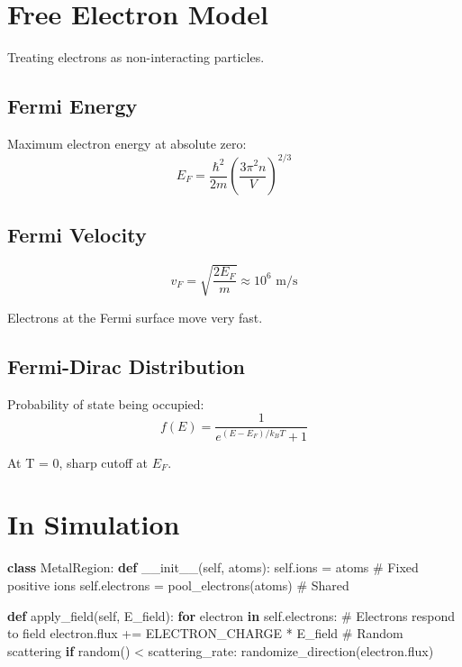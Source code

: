 \documentclass[
  11pt,
  letterpaper,
  twoside,
  openright]{book}
\newenvironment{Shaded}{\begin{snugshade}}{\end{snugshade}}
\newcommand{\CommentTok}[1]{\textcolor[rgb]{0.37,0.37,0.37}{#1}}
\newcommand{\ControlFlowTok}[1]{\textcolor[rgb]{0.00,0.23,0.31}{\textbf{#1}}}
\newcommand{\FunctionTok}[1]{\textcolor[rgb]{0.28,0.35,0.67}{#1}}
\newcommand{\KeywordTok}[1]{\textcolor[rgb]{0.00,0.23,0.31}{\textbf{#1}}}
\newcommand{\NormalTok}[1]{\textcolor[rgb]{0.00,0.23,0.31}{#1}}
\newcommand{\OperatorTok}[1]{\textcolor[rgb]{0.37,0.37,0.37}{#1}}
\newcommand{\VariableTok}[1]{\textcolor[rgb]{0.07,0.07,0.07}{#1}}
\begin{document}
\section{Free Electron Model}\label{free-electron-model}

Treating electrons as non-interacting particles.

\subsection{Fermi Energy}\label{fermi-energy}

Maximum electron energy at absolute zero: \[
E_F = \frac{\hbar^2}{2m}\left(\frac{3\pi^2 n}{V}\right)^{2/3}
\]

\subsection{Fermi Velocity}\label{fermi-velocity}

\[
v_F = \sqrt{\frac{2E_F}{m}} \approx 10^6 \text{ m/s}
\]

Electrons at the Fermi surface move very fast.

\subsection{Fermi-Dirac Distribution}\label{fermi-dirac-distribution}

Probability of state being occupied: \[
f(E) = \frac{1}{e^{(E-E_F)/k_BT} + 1}
\]

At T = 0, sharp cutoff at \(E_F\).

\section{In Simulation}\label{in-simulation-4}

\begin{Shaded}
\begin{Highlighting}[]
\KeywordTok{class}\NormalTok{ MetalRegion:}
    \KeywordTok{def} \FunctionTok{\_\_init\_\_}\NormalTok{(}\VariableTok{self}\NormalTok{, atoms):}
        \VariableTok{self}\NormalTok{.ions }\OperatorTok{=}\NormalTok{ atoms  }\CommentTok{\# Fixed positive ions}
        \VariableTok{self}\NormalTok{.electrons }\OperatorTok{=}\NormalTok{ pool\_electrons(atoms)  }\CommentTok{\# Shared}

    \KeywordTok{def}\NormalTok{ apply\_field(}\VariableTok{self}\NormalTok{, E\_field):}
        \ControlFlowTok{for}\NormalTok{ electron }\KeywordTok{in} \VariableTok{self}\NormalTok{.electrons:}
            \CommentTok{\# Electrons respond to field}
\NormalTok{            electron.flux }\OperatorTok{+=}\NormalTok{ ELECTRON\_CHARGE }\OperatorTok{*}\NormalTok{ E\_field}
            \CommentTok{\# Random scattering}
            \ControlFlowTok{if}\NormalTok{ random() }\OperatorTok{\textless{}}\NormalTok{ scattering\_rate:}
\NormalTok{                randomize\_direction(electron.flux)}
\end{Highlighting}
\end{Shaded}
\end{document}
